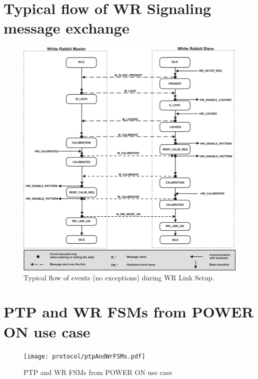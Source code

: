 \documentclass[a4paper, 12pt]{article}
\begin{document}
\newpage

\section{Typical flow of WR Signaling message exchange}
\label{ap:wr_lsu_flow}
\begin{figure}[ht!]
  \centering
  \includegraphics[width=1.0\textwidth]{protocol/wrMSGsExchangeFlow.pdf}
  \caption{Typical flow of events (no exceptions) during WR Link Setup.}
  \label{fig:wrFSMcommun}
\end{figure}

\newpage


\section{PTP and WR FSMs from POWER ON use case}
\label{ap:ptpAndWrFSMS}
\begin{figure}[ht!]
  \centering
  \texttt{[image: protocol/ptpAndWrFSMs.pdf]}
  \caption{PTP and WR FSMs from POWER ON use case}
  \label{fig:wrFSMcommun}
\end{figure}

\newpage
\end{document}
